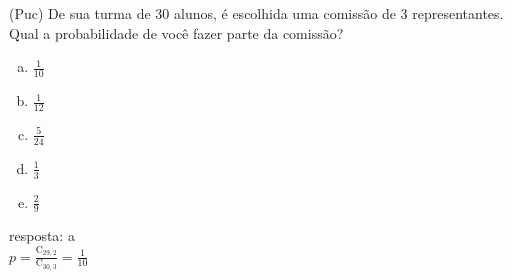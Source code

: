 \begin{ex}
	(Puc) De sua turma de 30 alunos, é escolhida uma comissão de 3 representantes. Qual a probabilidade de você fazer parte da comissão?
    \begin{enumerate}[(a)]
    \item $\frac{1}{10}$
    \item $\frac{1}{12}$
    \item $\frac{5}{24}$
    \item $\frac{1}{3}$
    \item $\frac{2}{9}$
    \end{enumerate}
      \begin{sol}
        resposta: a \\
        $p=\frac{\mathrm{C}_{{29},2}}{\mathrm{C}_{{30},3}}=\frac{1}{10}$
      \end{sol}
\end{ex}